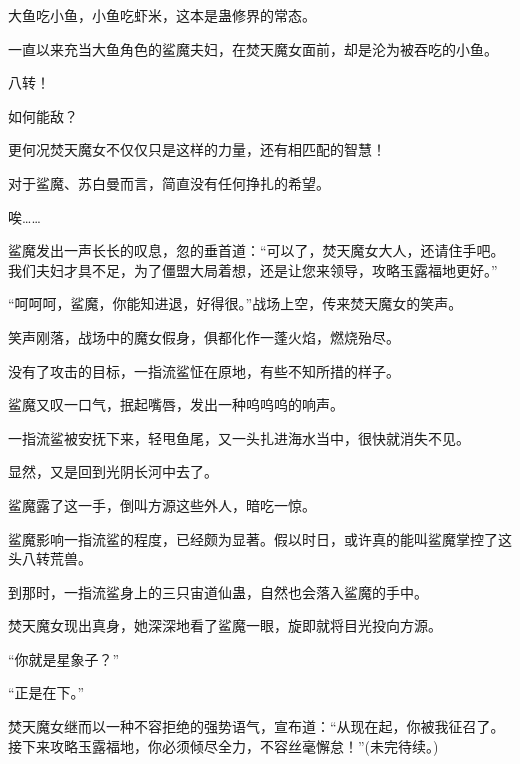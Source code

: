 \begin{this_body}
大鱼吃小鱼，小鱼吃虾米，这本是蛊修界的常态。

一直以来充当大鱼角色的鲨魔夫妇，在焚天魔女面前，却是沦为被吞吃的小鱼。

八转！

如何能敌？

更何况焚天魔女不仅仅只是这样的力量，还有相匹配的智慧！

对于鲨魔、苏白曼而言，简直没有任何挣扎的希望。

唉……

鲨魔发出一声长长的叹息，忽的垂首道：“可以了，焚天魔女大人，还请住手吧。我们夫妇才具不足，为了僵盟大局着想，还是让您来领导，攻略玉露福地更好。”

“呵呵呵，鲨魔，你能知进退，好得很。”战场上空，传来焚天魔女的笑声。

笑声刚落，战场中的魔女假身，俱都化作一蓬火焰，燃烧殆尽。

没有了攻击的目标，一指流鲨怔在原地，有些不知所措的样子。

鲨魔又叹一口气，抿起嘴唇，发出一种呜呜呜的响声。

一指流鲨被安抚下来，轻甩鱼尾，又一头扎进海水当中，很快就消失不见。

显然，又是回到光阴长河中去了。

鲨魔露了这一手，倒叫方源这些外人，暗吃一惊。

鲨魔影响一指流鲨的程度，已经颇为显著。假以时日，或许真的能叫鲨魔掌控了这头八转荒兽。

到那时，一指流鲨身上的三只宙道仙蛊，自然也会落入鲨魔的手中。

焚天魔女现出真身，她深深地看了鲨魔一眼，旋即就将目光投向方源。

“你就是星象子？”

“正是在下。”

焚天魔女继而以一种不容拒绝的强势语气，宣布道：“从现在起，你被我征召了。接下来攻略玉露福地，你必须倾尽全力，不容丝毫懈怠！”(未完待续。)

\end{this_body}

